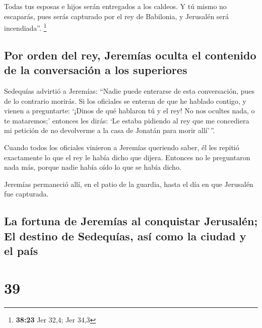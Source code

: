  Todas tus esposas e hijos serán entregados a los
caldeos. Y tú mismo no escaparás, pues serás capturado por el rey de
Babilonia, y Jerusalén será incendiada''. \footnote{\textbf{38:23} Jer
  32,4; Jer 34,3}

\hypertarget{por-orden-del-rey-jeremuxedas-oculta-el-contenido-de-la-conversaciuxf3n-a-los-superiores}{%
\subsection{Por orden del rey, Jeremías oculta el contenido de la
conversación a los
superiores}\label{por-orden-del-rey-jeremuxedas-oculta-el-contenido-de-la-conversaciuxf3n-a-los-superiores}}

 Sedequías advirtió a Jeremías: ``Nadie puede enterarse
de esta conversación, pues de lo contrario morirás.  Si
los oficiales se enteran de que he hablado contigo, y vienen a
preguntarte: `¡Dinos de qué hablaron tú y el rey! No nos ocultes nada, o
te mataremos;'  entonces les dirás: `Le estaba pidiendo
al rey que me concediera mi petición de no devolverme a la casa de
Jonatán para morir allí'\,''.

 Cuando todos los oficiales vinieron a Jeremías queriendo
saber, él les repitió exactamente lo que el rey le había dicho que
dijera. Entonces no le preguntaron nada más, porque nadie había oído lo
que se había dicho.

 Jeremías permaneció allí, en el patio de la guardia,
hasta el día en que Jerusalén fue capturada.

\hypertarget{la-fortuna-de-jeremuxedas-al-conquistar-jerusaluxe9n-el-destino-de-sedequuxedas-asuxed-como-la-ciudad-y-el-pauxeds}{%
\subsection{La fortuna de Jeremías al conquistar Jerusalén; El destino
de Sedequías, así como la ciudad y el
país}\label{la-fortuna-de-jeremuxedas-al-conquistar-jerusaluxe9n-el-destino-de-sedequuxedas-asuxed-como-la-ciudad-y-el-pauxeds}}

\hypertarget{section-38}{%
\section{39}\label{section-38}}


